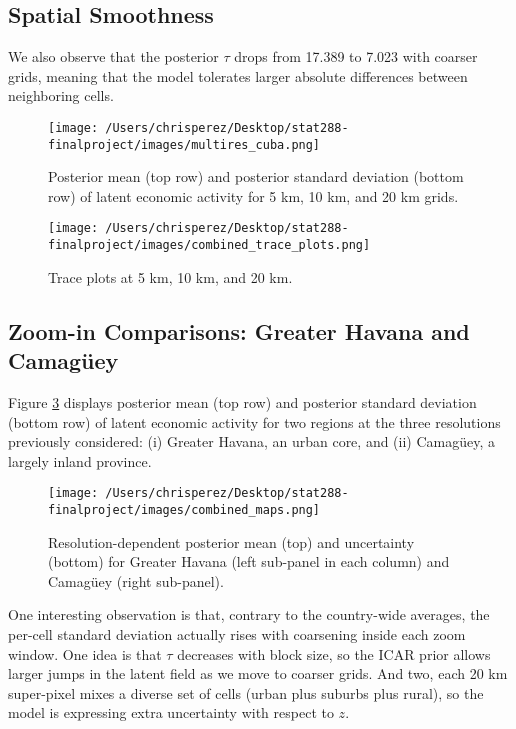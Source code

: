 \documentclass[12pt]{article}
\begin{document}
\subsection{Spatial Smoothness}
We also observe that the posterior $\tau$ drops from 17.389 to 7.023 with coarser grids, meaning that the model tolerates larger absolute differences between neighboring cells. 

\begin{figure}[H]\centering
  \texttt{[image: /Users/chrisperez/Desktop/stat288-finalproject/images/multires\_cuba.png]}
  \caption{Posterior mean (top row) and posterior standard deviation (bottom row) of latent economic activity for 5 km, 10 km, and 20 km grids.}
  \label{fig:multires_maps}
  \end{figure}
  
  \begin{figure}[H]\centering
  \texttt{[image: /Users/chrisperez/Desktop/stat288-finalproject/images/combined\_trace\_plots.png]}
  \caption{Trace plots at 5 km, 10 km, and 20 km.}
  \label{fig:multires_trace}
  \end{figure}
  

\subsection{Zoom-in Comparisons: Greater Havana and Camagüey}

Figure \ref{fig:multires_zoom} displays posterior mean (top row) and posterior standard deviation (bottom row) of latent economic activity for two regions at the three resolutions previously considered: (i) Greater Havana, an urban core, and (ii) Camagüey, a largely inland province. 


\begin{figure}[H]\centering
  \texttt{[image: /Users/chrisperez/Desktop/stat288-finalproject/images/combined\_maps.png]}
  \caption{Resolution-dependent posterior mean (top) and uncertainty (bottom) for Greater Havana (left sub-panel in each column) and Camagüey (right sub-panel).}
  \label{fig:multires_zoom}
  \end{figure}

One interesting observation is that, contrary to the country-wide averages, the per-cell standard deviation actually rises with coarsening inside each zoom window. One idea is that $\tau$ decreases with block size, so the ICAR prior allows larger jumps in the latent field as we move to coarser grids. And two, each 20 km super-pixel mixes a diverse set of cells (urban plus suburbs plus rural), so the model is expressing extra uncertainty with respect to $z$.
  
\end{document}
